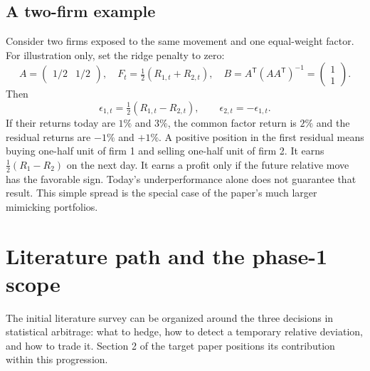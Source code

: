 \documentclass[11pt]{article}
\begin{document}
\subsection{A two-firm example}
\label{sec:two-firm}

Consider two firms exposed to the same movement and one equal-weight
factor. For illustration only, set the ridge penalty to zero:
\begin{equation}
 A=\begin{pmatrix}1/2&1/2\end{pmatrix},\quad
 F_t=\tfrac12(R_{1,t}+R_{2,t}),\quad
 B=A^{\mathsf T}(AA^{\mathsf T})^{-1}
   =\begin{pmatrix}1\\1\end{pmatrix}.
 \label{eq:two-firm-factors}
\end{equation}
Then
\begin{equation}
 \epsilon_{1,t}=\tfrac12(R_{1,t}-R_{2,t}),\qquad
 \epsilon_{2,t}=-\epsilon_{1,t}.
 \label{eq:two-firm-residual}
\end{equation}
If their returns today are $1\%$ and $3\%$, the common factor return is
$2\%$ and the residual returns are $-1\%$ and $+1\%$. A positive position
in the first residual means buying one-half unit of firm 1 and selling
one-half unit of firm 2. It earns $\tfrac12(R_1-R_2)$ on the next day.
It earns a profit only if the future relative move has the favorable sign.
Today's underperformance alone does not guarantee that result. This
simple spread is the special case of the paper's much larger mimicking
portfolios.

\section{Literature path and the phase-1 scope}
\label{sec:literature-path}

The initial literature survey can be organized around the three
decisions in statistical arbitrage: what to hedge, how to detect a
temporary relative deviation, and how to trade it. Section 2 of the
target paper positions its contribution within this progression.
\end{document}
